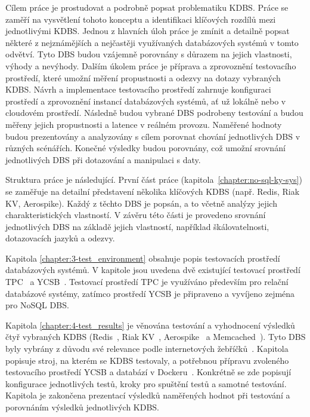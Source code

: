 \documentclass[czech,master,dept460,male,csharp,cpdeclaration]{diploma}
\begin{document}
	Cílem práce je prostudovat a podrobně popsat problematiku KDBS. Práce se zaměří na vysvětlení tohoto konceptu a identifikaci klíčových rozdílů mezi jednotlivými KDBS. Jednou z hlavních úloh práce je zmínit a detailně popsat některé z nejznámějších a nejčastěji využívaných databázových systémů v tomto odvětví. Tyto DBS budou vzájemně porovnány s důrazem na jejich vlastnosti, výhody a nevýhody. Dalším úkolem práce je příprava a zprovoznění testovacího prostředí, které umožní měření propustnosti a odezvy na dotazy vybraných KDBS. Návrh a implementace testovacího prostředí zahrnuje konfiguraci prostředí a zprovoznění instancí databázových systémů, ať už lokálně nebo v cloudovém prostředí. Následně budou vybrané DBS podrobeny testování a budou měřeny jejich propustnosti a latence v reálném provozu. Naměřené hodnoty budou prezentovány a analyzovány s cílem porovnat chování jednotlivých DBS v různých scénářích. Konečné výsledky budou porovnány, což umožní srovnání jednotlivých DBS při dotazování a manipulaci s daty.
	
	Struktura práce je následující. První část práce (kapitola~\ref{chapter:no-sql-ky-sys}) se zaměřuje na detailní představení několika klíčových KDBS (např. Redis, Riak KV, Aerospike). Každý z těchto DBS je popsán, a to včetně analýzy jejich charakteristických vlastností. V závěru této části je provedeno srovnání jednotlivých DBS na základě jejich vlastností, například škálovatelnosti, dotazovacích jazyků a odezvy.
	
	Kapitola \ref{chapter:3-test_environment} obsahuje popis testovacích prostředí databázových systémů. V kapitole jsou uvedena dvě existující testovací prostředí TPC~\cite{tpc} a YCSB~\cite{ycsb}. Testovací prostředí TPC je využíváno především pro relační databázové systémy, zatímco prostředí YCSB je připraveno a vyvíjeno zejména pro NoSQL DBS.
	
	Kapitola \ref{chapter:4-test_results} je věnována testování a vyhodnocení výsledků čtyř vybraných KDBS (Redis~\cite{redis}, Riak KV~\cite{riak}, Aerospike~\cite{aerospike} a Memcached~\cite{memcached}). Tyto DBS byly vybrány z důvodu své relevance podle internetových žebříčků~\cite{db-engineers-ranking, predictiveanalyticstoday}. Kapitola popisuje stroj, na kterém se KDBS testovaly, a potřebnou přípravu zvoleného testovacího prostředí YCSB a databází v Dockeru~\cite{docker}. Konkrétně se zde popisují konfigurace jednotlivých testů, kroky pro spuštění testů a samotné testování. Kapitola je zakončena prezentací výsledků naměřených hodnot při testování a porovnáním výsledků jednotlivých KDBS. 
	
\end{document}
